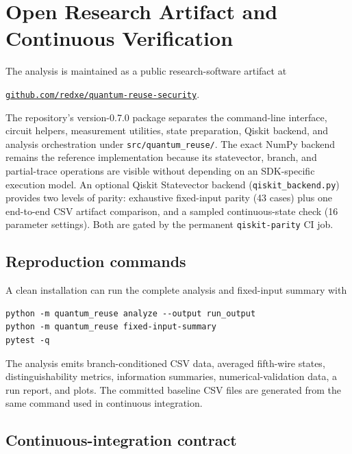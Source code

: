 \section{Open Research Artifact and Continuous Verification}
\label{sec:software-artifact}

The analysis is maintained as a public research-software artifact at
\begin{center}
\href{https://github.com/redxe/quantum-reuse-security}
{\texttt{github.com/redxe/quantum-reuse-security}}.
\end{center}
The repository's version-0.7.0 package separates the command-line interface,
circuit helpers, measurement utilities, state preparation, Qiskit backend,
and analysis orchestration under \texttt{src/quantum\_reuse/}. The exact NumPy
backend remains the reference implementation because its statevector, branch,
and partial-trace operations are visible without depending on an SDK-specific
execution model. An optional Qiskit Statevector backend (\texttt{qiskit\_backend.py})
provides two levels of parity: exhaustive fixed-input parity (43 cases) plus
one end-to-end CSV artifact comparison, and a sampled continuous-state check
(16 parameter settings). Both are gated by the permanent \texttt{qiskit-parity} CI job.

\subsection{Reproduction commands}

A clean installation can run the complete analysis and fixed-input summary with
\begin{lstlisting}[style=python]
python -m quantum_reuse analyze --output run_output
python -m quantum_reuse fixed-input-summary
pytest -q
\end{lstlisting}
The analysis emits branch-conditioned CSV data, averaged fifth-wire states,
distinguishability metrics, information summaries, numerical-validation data,
a run report, and plots. The committed baseline CSV files are generated from
the same command used in continuous integration.

\subsection{Continuous-integration contract}

